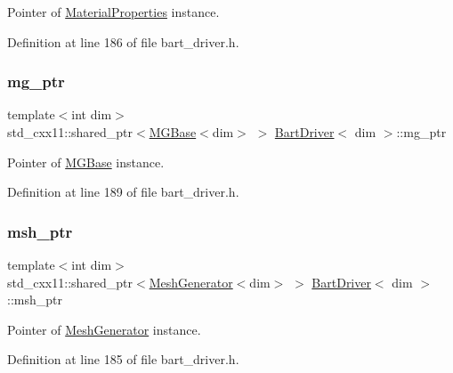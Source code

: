 Pointer of \hyperlink{class_material_properties}{Material\+Properties} instance. 



Definition at line 186 of file bart\+\_\+driver.\+h.

\mbox{\label{class_bart_driver_a1ae1a91d9a049ba4354c71f6ad689d74}} 
\subsubsection{\texorpdfstring{mg\+\_\+ptr}{mg\_ptr}}
{\footnotesize\ttfamily template$<$int dim$>$ \\
std\+\_\+cxx11\+::shared\+\_\+ptr$<$\hyperlink{class_m_g_base}{M\+G\+Base}$<$dim$>$ $>$ \hyperlink{class_bart_driver}{Bart\+Driver}$<$ dim $>$\+::mg\+\_\+ptr\hspace{0.3cm}{\ttfamily [private]}}



Pointer of \hyperlink{class_m_g_base}{M\+G\+Base} instance. 



Definition at line 189 of file bart\+\_\+driver.\+h.

\mbox{\label{class_bart_driver_a976c3ba1c98180dced85019dfd56e225}} 
\subsubsection{\texorpdfstring{msh\+\_\+ptr}{msh\_ptr}}
{\footnotesize\ttfamily template$<$int dim$>$ \\
std\+\_\+cxx11\+::shared\+\_\+ptr$<$\hyperlink{class_mesh_generator}{Mesh\+Generator}$<$dim$>$ $>$ \hyperlink{class_bart_driver}{Bart\+Driver}$<$ dim $>$\+::msh\+\_\+ptr\hspace{0.3cm}{\ttfamily [private]}}



Pointer of \hyperlink{class_mesh_generator}{Mesh\+Generator} instance. 



Definition at line 185 of file bart\+\_\+driver.\+h.

\mbox{\label{class_bart_driver_a3726013dac04d13b87e35cb0c3b8b557}} 
